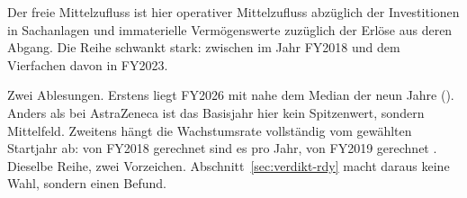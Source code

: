 Der freie Mittelzufluss ist hier operativer Mittelzufluss abz\"uglich der
Investitionen in Sachanlagen und immaterielle Verm\"ogenswerte zuz\"uglich der
Erl\"ose aus deren Abgang. Die Reihe schwankt stark: zwischen
\INRje{\RdyFcfJeAktieXVIII} im Jahr FY2018 und dem Vierfachen davon in FY2023.

Zwei Ablesungen. Erstens liegt FY2026 mit \INRje{\RdyFcfVoll} nahe dem Median
der neun Jahre (\INRje{\RdyFcfMedian}). Anders als bei AstraZeneca ist das
Basisjahr hier kein Spitzenwert, sondern Mittelfeld. Zweitens h\"angt die
Wachstumsrate vollst\"andig vom gew\"ahlten Startjahr ab: von FY2018
gerechnet sind es \Pct{\RdyCagr} pro Jahr, von FY2019 gerechnet
\Pct{\RdyCagrSieben}. Dieselbe Reihe, zwei Vorzeichen.
Abschnitt~\ref{sec:verdikt-rdy} macht daraus keine Wahl, sondern einen Befund.
